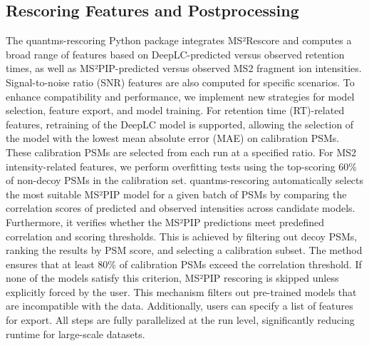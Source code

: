 \documentclass[12pt]{article}
\begin{document}
\subsection{Rescoring Features and Postprocessing}
The quantms-rescoring Python package %
integrates MS²Rescore and computes a broad range of features based on DeepLC-predicted versus observed retention times, as well as MS²PIP-predicted versus observed MS2 fragment ion intensities. Signal-to-noise ratio (SNR) features are also computed for specific scenarios. %
To enhance compatibility and performance, we implement new strategies for model selection, feature export, and model training. For retention time (RT)-related features, retraining of the DeepLC model is supported, allowing the selection of the model with the lowest mean absolute error (MAE) on calibration PSMs. These calibration PSMs are selected from each run at a specified ratio. %
For MS2 intensity-related features, we perform overfitting tests using the top-scoring 60\% of non-decoy PSMs in the calibration set. %
quantms-rescoring automatically selects the most suitable MS²PIP model for a given batch of PSMs by comparing the correlation scores of predicted and observed intensities across candidate models. Furthermore, it verifies whether the MS²PIP predictions meet predefined correlation and scoring thresholds. %
This is achieved by filtering out decoy PSMs, ranking the results by PSM score, and selecting a calibration subset. The method ensures that at least 80\% of calibration PSMs exceed the correlation threshold. If none of the models satisfy this criterion, MS²PIP rescoring is skipped unless explicitly forced by the user. This mechanism filters out pre-trained models that are incompatible with the data. %
Additionally, users can specify a list of features for export. All steps are fully parallelized at the run level, significantly reducing runtime for large-scale datasets.
 
\end{document}
